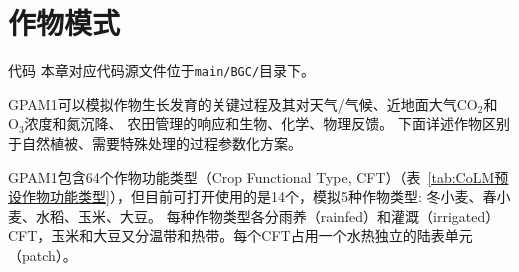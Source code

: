 \chapter{作物模式}
\begin{mymdframed}{代码}
  本章对应代码源文件位于\texttt{main/BGC/}目录下。
\end{mymdframed}

GPAM1可以模拟作物生长发育的关键过程及其对天气/气候、近地面大气$\mathrm{CO_2}$和$\mathrm{O_3}$浓度和氮沉降、
农田管理的响应和生物、化学、物理反馈。
下面详述作物区别于自然植被、需要特殊处理的过程参数化方案。

GPAM1包含64个作物功能类型（Crop Functional Type, CFT）（表~\ref{tab:CoLM预设作物功能类型}），但目前可打开使用的是14个，模拟5种作物类型: 冬小麦、春小麦、水稻、玉米、大豆。%
每种作物类型各分雨养（rainfed）和灌溉（irrigated）CFT，玉米和大豆又分温带和热带。每个CFT占用一个水热独立的陆表单元（patch）。

